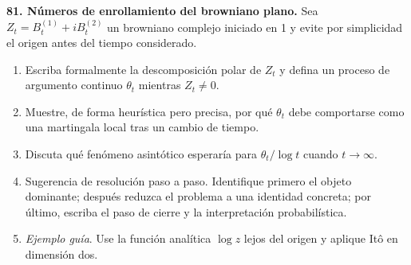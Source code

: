 \documentclass[11pt, letterpaper]{article}
\begin{document}
\newpage

\begin{ejercicio}
    \textbf{81. Números de enrollamiento del browniano plano.} Sea $Z_{t}=B_{t}^{(1)}+iB_{t}^{(2)}$ un browniano complejo iniciado en 1 y evite por simplicidad el origen antes del tiempo considerado.
    \begin{enumerate}
        \item Escriba formalmente la descomposición polar de $Z_{t}$ y defina un proceso de argumento continuo $\theta_{t}$ mientras $Z_{t}\ne 0$.
        \item Muestre, de forma heurística pero precisa, por qué $\theta_{t}$ debe comportarse como una martingala local tras un cambio de tiempo.
        \item Discuta qué fenómeno asintótico esperaría para $\theta_{t}/\log t$ cuando $t\rightarrow\infty$.
        \item Sugerencia de resolución paso a paso. Identifique primero el objeto dominante; después reduzca el problema a una identidad concreta; por último, escriba el paso de cierre y la interpretación probabilística.
        \item \textit{Ejemplo guía}. Use la función analítica $\log z$ lejos del origen y aplique Itô en dimensión dos.
    \end{enumerate}
\end{ejercicio}

\vspace{5mm}
\end{document}

